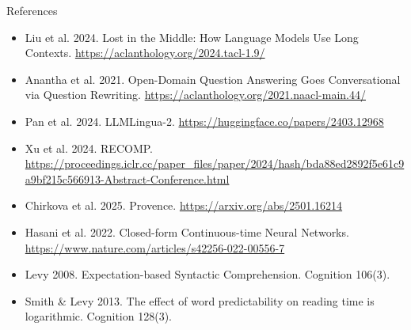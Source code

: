 \documentclass[aspectratio=169,11pt]{beamer}
\begin{document}
\begin{frame}{References}
  \footnotesize
  \begin{itemize}
    \item Liu et al. 2024. Lost in the Middle: How Language Models Use Long Contexts. \url{https://aclanthology.org/2024.tacl-1.9/}
    \item Anantha et al. 2021. Open-Domain Question Answering Goes Conversational via Question Rewriting. \url{https://aclanthology.org/2021.naacl-main.44/}
    \item Pan et al. 2024. LLMLingua-2. \url{https://huggingface.co/papers/2403.12968}
    \item Xu et al. 2024. RECOMP. \url{https://proceedings.iclr.cc/paper_files/paper/2024/hash/bda88ed2892f5e61c9a9bf215c566913-Abstract-Conference.html}
    \item Chirkova et al. 2025. Provence. \url{https://arxiv.org/abs/2501.16214}
    \item Hasani et al. 2022. Closed-form Continuous-time Neural Networks. \url{https://www.nature.com/articles/s42256-022-00556-7}
    \item Levy 2008. Expectation-based Syntactic Comprehension. Cognition 106(3).
    \item Smith \& Levy 2013. The effect of word predictability on reading time is logarithmic. Cognition 128(3).
  \end{itemize}
\end{frame}
\end{document}
